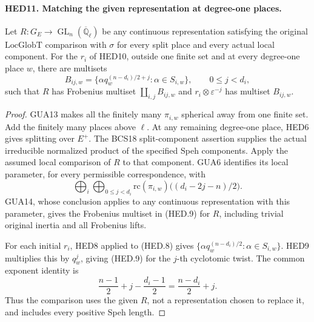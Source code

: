 \paragraph{HED11. Matching the given representation at degree-one places.}
\label{claim:HED11}
Let \(R:G_E\to\operatorname{GL}_n(\overline{\mathbb Q}_\ell)\)
be any continuous representation satisfying the original
\(\mathrm{LocGlobT}\) comparison with \(\sigma\) for every split
place and every actual local component.  For the \(r_i\) of HED10,
outside one finite set and at every degree-one place \(w\), there
are multisets
\[
 B_{ij,w}=\{\alpha q_w^{(n-d_i)/2+j}:\alpha\in S_{i,w}\},
                       \qquad 0\leq j<d_i,
 \tag{HED.9}
\]
such that \(R\) has Frobenius multiset \(\coprod_{i,j}B_{ij,w}\)
and \(r_i\otimes\varepsilon^{-j}\) has multiset \(B_{ij,w}\).
\begin{proof}
GUA13 makes all the finitely many \(\pi_{i,w}\) spherical away
from one finite set.  Add the finitely many places above \(\ell\).
At any remaining degree-one place, HED6 gives splitting over
\(E^+\).  The BCS18 split-component assertion supplies the actual
irreducible normalized product of the specified Speh components.
Apply the assumed local comparison of \(R\) to that component.
GUA6 identifies its local parameter, for every permissible
correspondence, with
\[
 \bigoplus_i\bigoplus_{0\leq j<d_i}
       \mathrm{rc}(\pi_{i,w})\bigl((d_i-2j-n)/2\bigr).
\]
GUA14, whose conclusion applies to any continuous representation
with this parameter, gives the Frobenius multiset in (HED.9) for
\(R\), including trivial original inertia and all Frobenius lifts.

For each initial \(r_i\), HED8 applied to (HED.8) gives
\(\{\alpha q_w^{(n-d_i)/2}:\alpha\in S_{i,w}\}\).
HED9 multiplies this by \(q_w^j\), giving (HED.9) for the
\(j\)-th cyclotomic twist.  The common exponent identity is
\[
 \frac{n-1}{2}+j-\frac{d_i-1}{2}
                          =\frac{n-d_i}{2}+j.
\]
Thus the comparison uses the given \(R\), not a representation
chosen to replace it, and includes every positive Speh length.
\end{proof}


